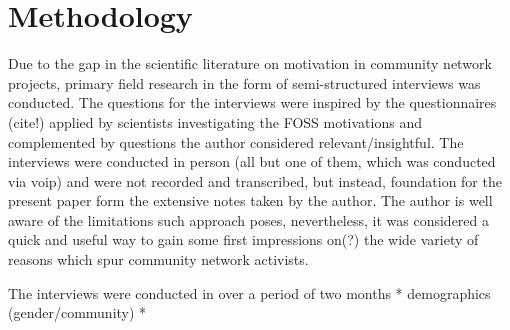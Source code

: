\section{Methodology}

Due to the gap in the scientific literature on motivation in community network projects, primary field research in the form of semi-structured interviews was conducted.
The questions for the interviews were inspired by the questionnaires (cite!) applied by scientists investigating the FOSS motivations and complemented by questions the author considered relevant/insightful. %
The interviews were conducted in person (all but one of them, which was conducted via voip) and were not recorded and transcribed, but instead, foundation for the present paper form the extensive notes taken by the author. %
The author is well aware of the limitations such approach poses, nevertheless, it was considered a quick and useful way to gain some first impressions on(?) the wide variety of reasons which spur community network activists.

The interviews were conducted in over a period of two months
* demographics (gender/community)
* 

\begin{comment}
\begin{itemize}
  \item literature review for FOSS <-- only as comparison
  \item semi-structured interviews for Freifunk <-- focus
    \begin{itemize}
      \item limitations of the methodology
    \end{itemize}
\end{itemize}
\end{comment}
